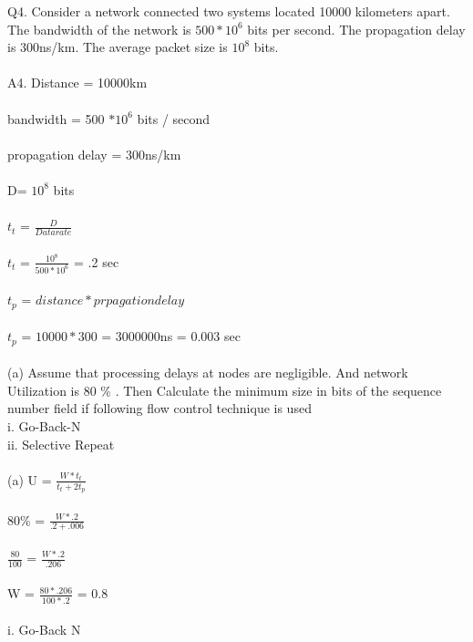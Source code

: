 \documentclass[a4paper,12pt]{article}
\begin{document}
 Q4. Consider a network connected two systems located 10000 kilometers apart. The bandwidth
of the network is $500 * 10^6$ bits per second. The propagation delay is 300ns/km. The
average packet size is $10^8$ bits.\\\\
A4. Distance = 10000km\\\\
 bandwidth = 500 $* 10^6$ bits / second \\\\
 propagation delay = 300ns/km\\\\
 D= $10^8$ bits\\\\

 $t_{t}$ = $\frac{D}{Data rate}$\\\\
 $t_{t}$ = $\frac{10^8}{ 500 * 10^6}$ = .2 sec\\\\
 $t_{p}$ = $ distance * prpagation delay $ \\\\
 $t_{p}$ = $ 10000 * 300 $  = 3000000ns = 0.003 sec\\\\
(a) Assume that processing delays at nodes are negligible. And network Utilization is
80 \% . Then Calculate the minimum size in bits of the sequence number field if
following
flow control technique is used\\

i. Go-Back-N\\
ii. Selective Repeat\\\\

(a) U = $\frac{W* t_{t}}{t_{t}+2t_{p}}$ \\\\
  80\% =  $\frac{W* .2}{.2 + .006}$\\\\
  $\frac{80}{100}$ = $\frac{W * .2}{.206}$\\\\
  W = $\frac{80*.206}{100*.2}$ = 0.8\\\\

   i. Go-Back N\\\\
\end{document}
